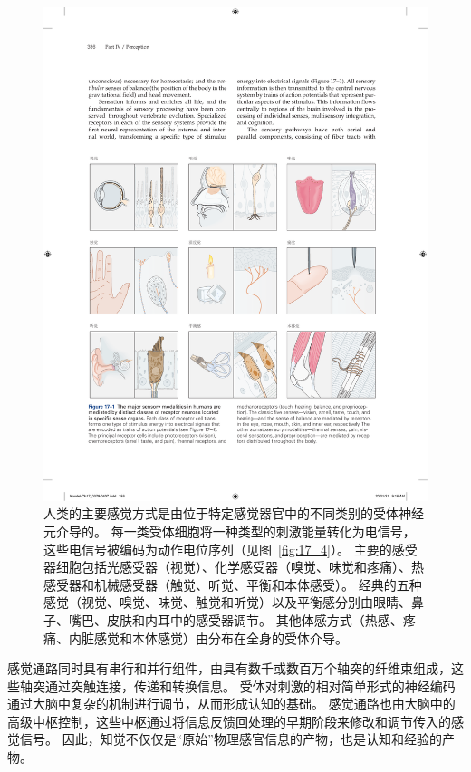 \begin{figure}[htbp]
	\centering
	\includegraphics[width=1.0\linewidth]{chap17/fig_17_1}
	\caption{人类的主要感觉方式是由位于特定感觉器官中的不同类别的受体神经元介导的。 
		每一类受体细胞将一种类型的刺激能量转化为电信号，这些电信号被编码为动作电位序列（见图~\ref{fig:17_4}）。 
		主要的感受器细胞包括光感受器（视觉）、化学感受器（嗅觉、味觉和疼痛）、热感受器和机械感受器（触觉、听觉、平衡和本体感受）。 
		经典的五种感觉（视觉、嗅觉、味觉、触觉和听觉）以及平衡感分别由眼睛、鼻子、嘴巴、皮肤和内耳中的感受器调节。 
		其他体感方式（热感、疼痛、内脏感觉和本体感觉）由分布在全身的受体介导。}
	\label{fig:17_1}
\end{figure}



感觉通路同时具有串行和并行组件，由具有数千或数百万个轴突的纤维束组成，这些轴突通过突触连接，传递和转换信息。 
受体对刺激的相对简单形式的神经编码通过大脑中复杂的机制进行调节，从而形成认知的基础。 
感觉通路也由大脑中的高级中枢控制，这些中枢通过将信息反馈回处理的早期阶段来修改和调节传入的感觉信号。 
因此，知觉不仅仅是“原始”物理感官信息的产物，也是认知和经验的产物。


